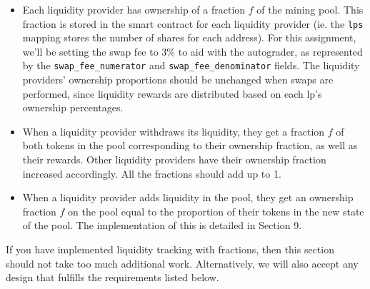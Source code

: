 \documentclass[11pt]{article}
\begin{document}
\begin{itemize}
    \item Each liquidity provider has ownership of a fraction $f$ of the mining pool. This fraction is stored in the smart contract for each liquidity provider (ie. the \texttt{lps} mapping stores the number of shares for each address). For this assignment, we'll be setting the swap fee to $3\%$ to aid with the autograder, as represented by the \texttt{swap\_fee\_numerator} and \texttt{swap\_fee\_denominator} fields. The liquidity providers' ownership proportions should be unchanged when swaps are performed, since liquidity rewards are distributed based on each lp's ownership percentages.
    \item When a liquidity provider withdraws its liquidity, they get a fraction $f$ of both tokens in the pool corresponding to their ownership fraction, as well as their rewards. Other liquidity providers have their ownership fraction increased accordingly. All the fractions should add up to 1. 
    \item When a liquidity provider adds liquidity in the pool, they get an ownership fraction $f$ on the pool equal to the proportion of their tokens in the new state of the pool. The implementation of this is detailed in Section 9.
\end{itemize}
    If you have implemented liquidity tracking with fractions, then this section should not take too much additional work. Alternatively, we will also accept any design that fulfills the requirements listed below. \\
\end{document}
